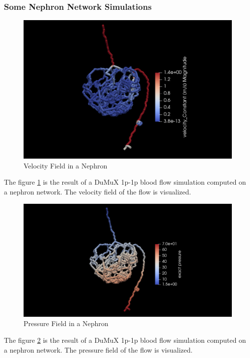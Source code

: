 \subsubsection*{Some Nephron Network Simulations}

\begin{figure}[h]
\centering
\includegraphics[width=162mm]{nephron_velocity}
\caption{Velocity Field in a Nephron}
\label{fig:nephron_velocity}
\end{figure}
The figure \ref{fig:nephron_velocity} is the result of a DuMuX 1p-1p blood flow simulation computed on a nephron network. The velocity field of the flow is visualized.\\

\begin{figure}[h]
\centering
\includegraphics[width=162mm]{nephron_pressure}
\caption{Pressure Field in a Nephron}
\label{fig:nephron_pressure}
\end{figure}
The figure \ref{fig:nephron_pressure} is the result of a DuMuX 1p-1p blood flow simulation computed on a nephron network. The pressure field of the flow is visualized.\\


